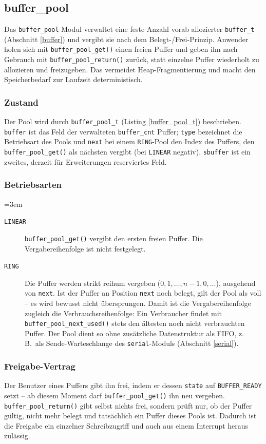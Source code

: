 \subsection{buffer\_pool}\label{buffer_pool}
Das \verb|buffer_pool| Modul verwaltet eine feste Anzahl vorab allozierter
\verb|buffer_t| (Abschnitt \ref{buffer}) und vergibt sie nach dem
Belegt-/Frei-Prinzip. Anwender holen sich mit \verb|buffer_pool_get()|
einen freien Puffer und geben ihn nach Gebrauch mit
\verb|buffer_pool_return()| zurück, statt einzelne Puffer wiederholt zu
allozieren und freizugeben. Das vermeidet Heap-Fragmentierung und macht den
Speicherbedarf zur Laufzeit deterministisch.

\subsubsection*{Zustand}
Der Pool wird durch \verb|buffer_pool_t| (Listing \ref{buffer_pool_t})
beschrieben. \verb|buffer| ist das Feld der verwalteten
\verb|buffer_cnt| Puffer; \verb|type| bezeichnet die Betriebsart des Pools
und \verb|next| bei einem \verb|RING|-Pool den Index des Puffers, den
\verb|buffer_pool_get()| als nächsten vergibt (bei \verb|LINEAR| negativ).
\verb|sbuffer| ist ein zweites, derzeit für Erweiterungen reserviertes Feld.

\subsubsection*{Betriebsarten}
{\sloppy\emergencystretch=3em
\begin{description}
\item[\texttt{LINEAR}] \verb|buffer_pool_get()| vergibt den ersten freien
  Puffer. Die Vergabereihenfolge ist nicht festgelegt.
\item[\texttt{RING}] Die Puffer werden strikt reihum vergeben
  ($0, 1, \dots, n-1, 0, \dots$), ausgehend von \verb|next|. Ist der Puffer
  an Position \verb|next| noch belegt, gilt der Pool als voll -- es wird
  bewusst nicht übersprungen. Damit ist die Vergabereihenfolge zugleich die
  Verbrauchsreihenfolge: Ein Verbraucher findet mit
  \verb|buffer_pool_next_used()| stets den ältesten noch nicht verbrauchten
  Puffer. Der Pool dient so ohne zusätzliche Datenstruktur als FIFO, z.\,B.\
  als Sende-Warteschlange des \verb|serial|-Moduls (Abschnitt
  \ref{serial}).
\end{description}
\par}

\subsubsection*{Freigabe-Vertrag}
Der Benutzer eines Puffers gibt ihn frei, indem er dessen \verb|state| auf
\verb|BUFFER_READY| setzt -- ab diesem Moment darf \verb|buffer_pool_get()|
ihn neu vergeben. \verb|buffer_pool_return()| gibt selbst nichts frei,
sondern prüft nur, ob der Puffer gültig, nicht mehr belegt und
tatsächlich ein Puffer dieses Pools ist. Dadurch ist die Freigabe ein
einzelner Schreibzugriff und auch aus einem Interrupt heraus zulässig.

